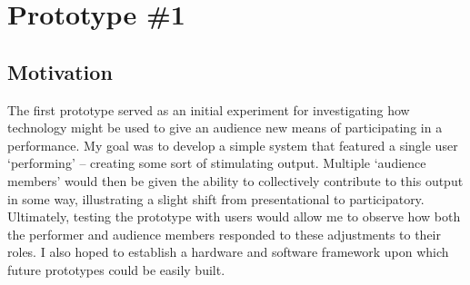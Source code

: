 
\section{Prototype \#1}

\subsection{Motivation}

The first prototype served as an initial experiment for investigating how technology might be used to give an audience new means of participating in a performance. My goal was to develop a simple system that featured a single user `performing' -- creating some sort of stimulating output. Multiple `audience members' would then be given the ability to collectively contribute to this output in some way, illustrating a slight shift from presentational to participatory. Ultimately, testing the prototype with users would allow me to observe how both the performer and audience members responded to these adjustments to their roles. I also hoped to establish a hardware and software framework upon which future prototypes could be easily built.


